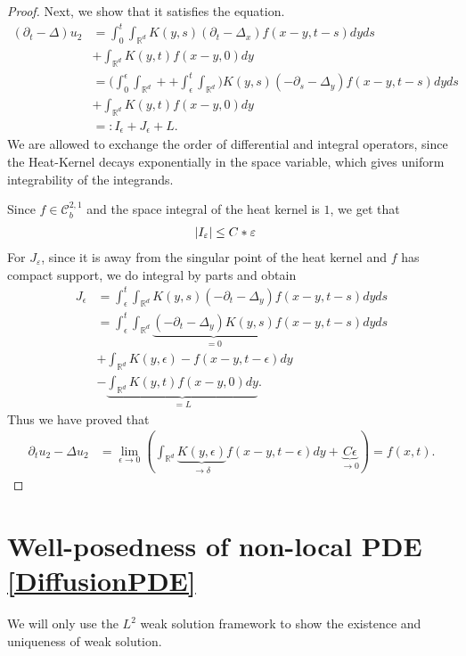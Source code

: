 \begin{proof}
  Next, we show that it satisfies the equation. 
  \begin{align*}
    (\partial_t - \Delta )u_{2}  &= \int_0^{t} \int_{\mathbb{R}^{d} } K(y,s)(\partial_t - \Delta_x)f(x-y,t-s) dy ds \\
                                 &+ \int_{\mathbb{R}^{d} } K(y,t)f(x-y,0) dy\\
                                 &= \Big( \int_{0}^{\epsilon} \int_{\mathbb{R}^{d} } ++  \int_{\epsilon}^{t} \int_{\mathbb{R}^{d} }\Big)K(y,s) \left( -\partial_s - \Delta_y \right)f(x-y,t-s) dy ds  \\
                                 &+   \int_{\mathbb{R}^{d} } K(y,t)f(x-y,0) dy\\
                                 &=: I_{\epsilon} +  J_{\epsilon} + L
  .\end{align*}
  We are allowed to exchange the order of differential and integral operators, since the Heat-Kernel decays exponentially in the space variable, which gives uniform integrability of the integrands.
  
  Since $f \in  \mathcal{C}_b^{2,1}  $ and the space integral of the heat kernel is $1$, we get that 
  \begin{align*}
    \lvert I_\varepsilon\rvert &\le  C*\varepsilon
  \end{align*}  
  For $J_\varepsilon$, since it is away from the singular point of the heat kernel and $f$ has compact support, we do integral by parts and obtain
  \begin{align*}
    J_{\epsilon} &= \int_{\epsilon}^{t}  \int_{\mathbb{R}^{d} } K(y,s)(-\partial_t - \Delta_y) f(x-y,t-s)dy ds\\
                 &= \int_{\epsilon}^{t}  \int_{\mathbb{R}^{d} } \underbrace{(-\partial_t - \Delta_y)K(y,s)}_{=0}f(x-y,t-s)dy ds\\ 
                 &+ \int_{\mathbb{R}^{d} }K(y,\epsilon) - f(x-y,t-\epsilon) dy \\
                 &-\underbrace{\int_{\mathbb{R}^{d} } K(y,t) f(x-y,0) dy}_{=L }
  .\end{align*}
Thus we have proved that
\begin{align*}
\partial_t u_{2} - \Delta u_{2} &= \lim_{\epsilon \to 0} \left( \int_{\mathbb{R}^{d} } \underbrace{K(y,\epsilon)}_{\to \delta} f(x-y,t-\epsilon) dy + \underbrace{C\epsilon}_{\to 0} \right)  = f(x,t)
.\end{align*}
\end{proof}


\section{Well-posedness of non-local PDE \autoref{DiffusionPDE}}
We will only use the $L^2$ weak solution framework to show the existence and uniqueness of weak solution. 

